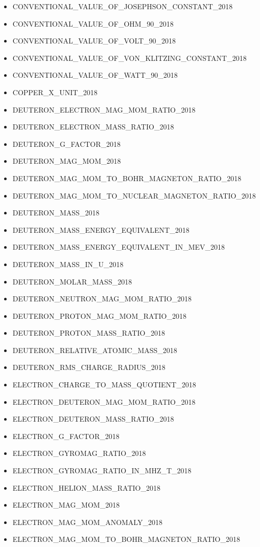 \begin{itemize}
\item CONVENTIONAL\_VALUE\_OF\_JOSEPHSON\_CONSTANT\_2018
\item CONVENTIONAL\_VALUE\_OF\_OHM\_90\_2018
\item CONVENTIONAL\_VALUE\_OF\_VOLT\_90\_2018
\item CONVENTIONAL\_VALUE\_OF\_VON\_KLITZING\_CONSTANT\_2018
\item CONVENTIONAL\_VALUE\_OF\_WATT\_90\_2018
\item COPPER\_X\_UNIT\_2018
\item DEUTERON\_ELECTRON\_MAG\_MOM\_RATIO\_2018
\item DEUTERON\_ELECTRON\_MASS\_RATIO\_2018
\item DEUTERON\_G\_FACTOR\_2018
\item DEUTERON\_MAG\_MOM\_2018
\item DEUTERON\_MAG\_MOM\_TO\_BOHR\_MAGNETON\_RATIO\_2018
\item DEUTERON\_MAG\_MOM\_TO\_NUCLEAR\_MAGNETON\_RATIO\_2018
\item DEUTERON\_MASS\_2018
\item DEUTERON\_MASS\_ENERGY\_EQUIVALENT\_2018
\item DEUTERON\_MASS\_ENERGY\_EQUIVALENT\_IN\_MEV\_2018
\item DEUTERON\_MASS\_IN\_U\_2018
\item DEUTERON\_MOLAR\_MASS\_2018
\item DEUTERON\_NEUTRON\_MAG\_MOM\_RATIO\_2018
\item DEUTERON\_PROTON\_MAG\_MOM\_RATIO\_2018
\item DEUTERON\_PROTON\_MASS\_RATIO\_2018
\item DEUTERON\_RELATIVE\_ATOMIC\_MASS\_2018
\item DEUTERON\_RMS\_CHARGE\_RADIUS\_2018
\item ELECTRON\_CHARGE\_TO\_MASS\_QUOTIENT\_2018
\item ELECTRON\_DEUTERON\_MAG\_MOM\_RATIO\_2018
\item ELECTRON\_DEUTERON\_MASS\_RATIO\_2018
\item ELECTRON\_G\_FACTOR\_2018
\item ELECTRON\_GYROMAG\_RATIO\_2018
\item ELECTRON\_GYROMAG\_RATIO\_IN\_MHZ\_T\_2018
\item ELECTRON\_HELION\_MASS\_RATIO\_2018
\item ELECTRON\_MAG\_MOM\_2018
\item ELECTRON\_MAG\_MOM\_ANOMALY\_2018
\item ELECTRON\_MAG\_MOM\_TO\_BOHR\_MAGNETON\_RATIO\_2018

\end{itemize}
